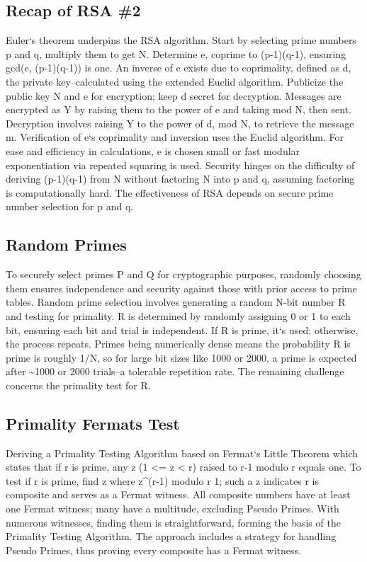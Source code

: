 \subsection*{Recap of RSA \#2}
Euler`s theorem underpins the RSA algorithm.
Start by selecting prime numbers p and q, multiply them to get N\@.
Determine e, coprime to (p-1)(q-1), ensuring gcd(e, (p-1)(q-1)) is one.
An inverse of e exists due to coprimality, defined as d, the private key--calculated using the extended Euclid algorithm.
Publicize the public key N and e for encryption; keep d secret for decryption.
Messages are encrypted as Y by raising them to the power of e and taking mod N, then sent.
Decryption involves raising Y to the power of d, mod N, to retrieve the message m.
Verification of e`s coprimality and inversion uses the Euclid algorithm.
For ease and efficiency in calculations, e is chosen small or fast modular exponentiation via repeated squaring is used.
Security hinges on the difficulty of deriving (p-1)(q-1) from N without factoring N into p and q, assuming factoring is computationally hard.
The effectiveness of RSA depends on secure prime number selection for p and q.

\subsection*{Random Primes}
To securely select primes P and Q for cryptographic purposes, randomly choosing them ensures independence and security against those with prior access to prime tables.
Random prime selection involves generating a random N-bit number R and testing for primality.
R is determined by randomly assigning 0 or 1 to each bit, ensuring each bit and trial is independent.
If R is prime, it`s used; otherwise, the process repeats.
Primes being numerically dense means the probability R is prime is roughly 1/N, so for large bit sizes like 1000 or 2000, a prime is expected after \textasciitilde{}1000 or 2000 trials--a tolerable repetition rate.
The remaining challenge concerns the primality test for R\@.

\subsection*{Primality  Fermats Test}
Deriving a Primality Testing Algorithm based on Fermat`s Little Theorem which states that if r is prime, any z (1 \textless{}= z \textless{} r) raised to r-1 modulo r equals one.
To test if r is prime, find z where z\textasciicircum{}(r-1) modulo r  1; such a z indicates r is composite and serves as a Fermat witness.
All composite numbers have at least one Fermat witness; many have a multitude, excluding Pseudo Primes.
With numerous witnesses, finding them is straightforward, forming the basis of the Primality Testing Algorithm.
The approach includes a strategy for handling Pseudo Primes, thus proving every composite has a Fermat witness.

